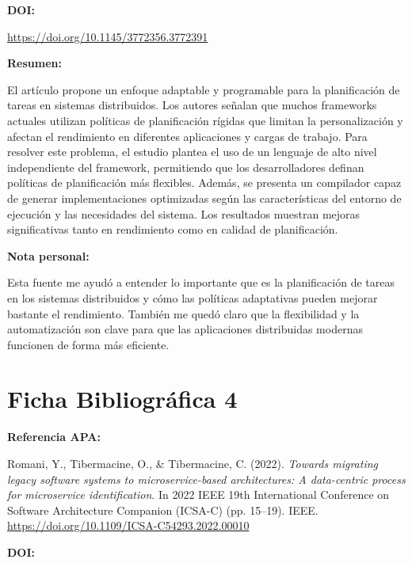 \documentclass[12pt]{article}
\begin{document}
\vspace{0.3cm}

\textbf{DOI:}

\url{https://doi.org/10.1145/3772356.3772391}

\vspace{0.3cm}

\textbf{Resumen:}

El artículo propone un enfoque adaptable y programable para la planificación de tareas en sistemas distribuidos. Los autores señalan que muchos frameworks actuales utilizan políticas de planificación rígidas que limitan la personalización y afectan el rendimiento en diferentes aplicaciones y cargas de trabajo. Para resolver este problema, el estudio plantea el uso de un lenguaje de alto nivel independiente del framework, permitiendo que los desarrolladores definan políticas de planificación más flexibles. Además, se presenta un compilador capaz de generar implementaciones optimizadas según las características del entorno de ejecución y las necesidades del sistema. Los resultados muestran mejoras significativas tanto en rendimiento como en calidad de planificación.

\vspace{0.3cm}

\textbf{Nota personal:}

Esta fuente me ayudó a entender lo importante que es la planificación de tareas en los sistemas distribuidos y cómo las políticas adaptativas pueden mejorar bastante el rendimiento. También me quedó claro que la flexibilidad y la automatización son clave para que las aplicaciones distribuidas modernas funcionen de forma más eficiente.

\newpage

\section{Ficha Bibliográfica 4}

\textbf{Referencia APA:}

Romani, Y., Tibermacine, O., \& Tibermacine, C. (2022). \textit{Towards migrating legacy software systems to microservice-based architectures: A data-centric process for microservice identification}. In 2022 IEEE 19th International Conference on Software Architecture Companion (ICSA-C) (pp. 15--19). IEEE. \url{https://doi.org/10.1109/ICSA-C54293.2022.00010}

\vspace{0.3cm}

\textbf{DOI:}
\end{document}
